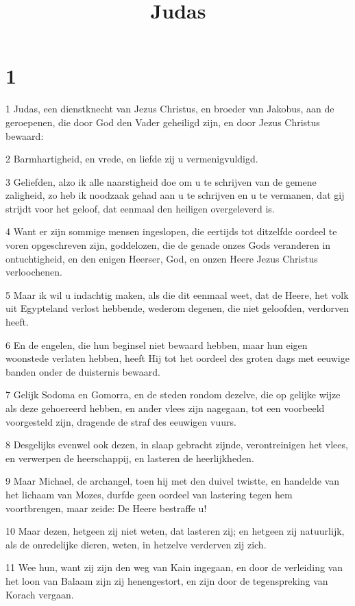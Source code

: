 

\title{Judas}



\chapter{1}

\par 1 Judas, een dienstknecht van Jezus Christus, en broeder van Jakobus, aan de geroepenen, die door God den Vader geheiligd zijn, en door Jezus Christus bewaard:
\par 2 Barmhartigheid, en vrede, en liefde zij u vermenigvuldigd.
\par 3 Geliefden, alzo ik alle naarstigheid doe om u te schrijven van de gemene zaligheid, zo heb ik noodzaak gehad aan u te schrijven en u te vermanen, dat gij strijdt voor het geloof, dat eenmaal den heiligen overgeleverd is.
\par 4 Want er zijn sommige mensen ingeslopen, die eertijds tot ditzelfde oordeel te voren opgeschreven zijn, goddelozen, die de genade onzes Gods veranderen in ontuchtigheid, en den enigen Heerser, God, en onzen Heere Jezus Christus verloochenen.
\par 5 Maar ik wil u indachtig maken, als die dit eenmaal weet, dat de Heere, het volk uit Egypteland verlost hebbende, wederom degenen, die niet geloofden, verdorven heeft.
\par 6 En de engelen, die hun beginsel niet bewaard hebben, maar hun eigen woonstede verlaten hebben, heeft Hij tot het oordeel des groten dags met eeuwige banden onder de duisternis bewaard.
\par 7 Gelijk Sodoma en Gomorra, en de steden rondom dezelve, die op gelijke wijze als deze gehoereerd hebben, en ander vlees zijn nagegaan, tot een voorbeeld voorgesteld zijn, dragende de straf des eeuwigen vuurs.
\par 8 Desgelijks evenwel ook dezen, in slaap gebracht zijnde, verontreinigen het vlees, en verwerpen de heerschappij, en lasteren de heerlijkheden.
\par 9 Maar Michael, de archangel, toen hij met den duivel twistte, en handelde van het lichaam van Mozes, durfde geen oordeel van lastering tegen hem voortbrengen, maar zeide: De Heere bestraffe u!
\par 10 Maar dezen, hetgeen zij niet weten, dat lasteren zij; en hetgeen zij natuurlijk, als de onredelijke dieren, weten, in hetzelve verderven zij zich.
\par 11 Wee hun, want zij zijn den weg van Kain ingegaan, en door de verleiding van het loon van Balaam zijn zij henengestort, en zijn door de tegenspreking van Korach vergaan.
